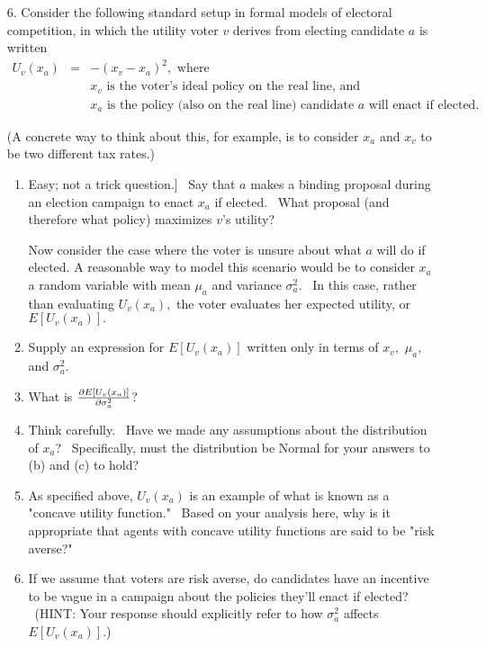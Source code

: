 \documentclass[11pt]{article}
\begin{document}
\begin{enumerate}
\item[6.] Consider the following standard setup in formal models of
electoral competition, in which the utility voter $v$ derives from electing
candidate $a$ is written 
\begin{eqnarray*}
U_{v}\left( x_{a}\right)  &=&-\left( x_{v}-x_{a}\right) ^{2},\text{ where} \\
&&x_{v}\text{ is the voter's ideal policy on the real line, and} \\
&&x_{a}\text{ is the policy (also on the real line) candidate }a\text{ will
enact if elected.}
\end{eqnarray*}

(A concrete way to think about this, for example, is to consider $x_{a}$ and 
$x_{v}$ to be two different tax rates.)

\begin{enumerate}
\item \lbrack Easy; not a trick question.] \ Say that $a$ makes a binding
proposal during an election campaign to enact $x_{a}$ if elected. \ What
proposal (and therefore what policy) maximizes $v$'s utility?\medskip 

Now consider the case where the voter is unsure about what $a$ will do if
elected. A reasonable way to model this scenario would be to consider $x_{a}$
a random variable with mean $\mu _{a}$ and variance $\sigma _{a}^{2}.$ \ In
this case, rather than evaluating $U_{v}\left( x_{a}\right) ,$ the voter
evaluates her expected utility, or $E\left[ U_{v}\left( x_{a}\right) \right]
.$\medskip 

\item Supply an expression for $E\left[ U_{v}\left( x_{a}\right) \right] $
written only in terms of $x_{v},$ $\mu _{a},$ and $\sigma _{a}^{2}.$\medskip 

\item What is $\frac{\partial E\left[ U_{v}\left( x_{a}\right) \right] }{%
\partial \sigma _{a}^{2}}$?\medskip 

\item Think carefully. \ Have we made any assumptions about the distribution
of $x_{a}$? \ Specifically, must the distribution be Normal for your answers
to (b) and (c) to hold?\medskip 

\item As specified above, $U_{v}\left( x_{a}\right) $ is an example of what
is known as a "concave utility function." \ Based on your analysis here, why
is it appropriate that agents with concave utility functions are said to be
"risk averse?"\medskip 

\item If we assume that voters are risk averse, do candidates have an
incentive to be vague in a campaign about the policies they'll enact if
elected? \ (HINT: Your response should explicitly refer to how $\sigma
_{a}^{2}$ affects $E\left[ U_{v}\left( x_{a}\right) \right] $.) \medskip 
\end{enumerate}
\end{enumerate}
\end{document}
